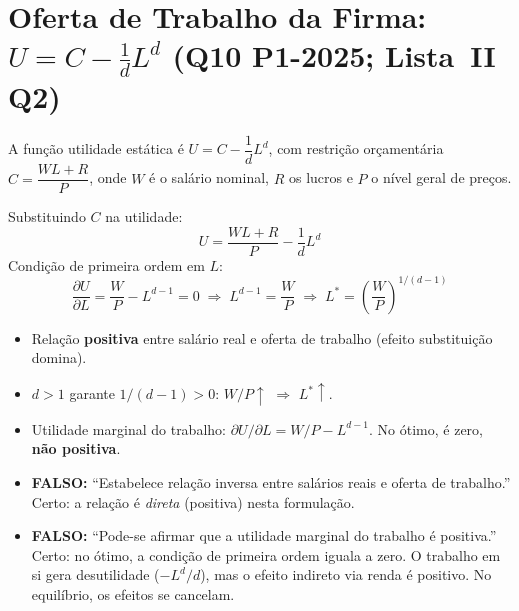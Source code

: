 \documentclass[12pt, a4paper]{article}
\begin{document}
\section{Oferta de Trabalho da Firma: $U = C - \tfrac{1}{d}L^d$ (Q10 P1-2025; Lista~II Q2)}

A função utilidade estática é $U = C - \dfrac{1}{d}L^d$, com restrição orçamentária $C = \dfrac{WL + R}{P}$, onde $W$ é o salário nominal, $R$ os lucros e $P$ o nível geral de preços.

\begin{formulabox}[title={Derivação da oferta de trabalho (Q10, gabarito = b)}]
Substituindo $C$ na utilidade:
\[
  U = \frac{WL+R}{P} - \frac{1}{d}L^d
\]
Condição de primeira ordem em $L$:
\[
  \frac{\partial U}{\partial L} = \frac{W}{P} - L^{d-1} = 0 \;\Rightarrow\; L^{d-1} = \frac{W}{P} \;\Rightarrow\; \boxed{L^* = \left(\frac{W}{P}\right)^{1/(d-1)}}
\]
\end{formulabox}

\begin{fatorbox}[title={Interpretação}]
\begin{itemize}[leftmargin=*]
  \item Relação \textbf{positiva} entre salário real e oferta de trabalho (efeito substituição domina).
  \item $d > 1$ garante $1/(d-1) > 0$: $W/P\uparrow$ $\Rightarrow$ $L^*\uparrow$.
  \item Utilidade marginal do trabalho: $\partial U/\partial L = W/P - L^{d-1}$. No ótimo, é zero, \textbf{não positiva}.
\end{itemize}
\end{fatorbox}

\begin{armbox}[title={Armadilhas (Q10)}]
\begin{itemize}[leftmargin=*]
  \item \textbf{FALSO:} ``Estabelece relação inversa entre salários reais e oferta de trabalho.'' \\ Certo: a relação é \emph{direta} (positiva) nesta formulação.
  \item \textbf{FALSO:} ``Pode-se afirmar que a utilidade marginal do trabalho é positiva.'' \\ Certo: no ótimo, a condição de primeira ordem iguala a zero. O trabalho em si gera desutilidade ($-L^d/d$), mas o efeito indireto via renda é positivo. No equilíbrio, os efeitos se cancelam.
\end{itemize}
\end{armbox}
\end{document}
